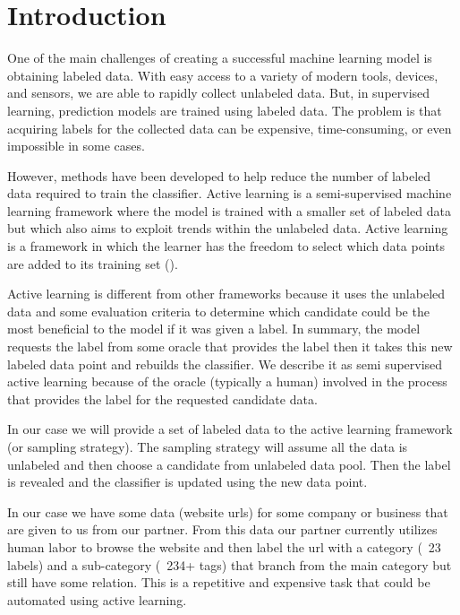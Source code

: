 \chapter*{Introduction}

One of the main challenges of creating a successful machine learning model is obtaining labeled data. With easy access to a variety of modern tools, devices, and sensors, we are able to rapidly collect unlabeled data. But, in supervised learning, prediction models are trained using labeled data. The problem is that acquiring labels for the collected data can be expensive, time-consuming, or even impossible in some cases.  

However, methods have been developed to help reduce the number of labeled data required to train the classifier. Active learning is a semi-supervised machine learning framework where the model is trained with a smaller set of labeled data but which also aims to exploit trends within the unlabeled data. Active learning is a framework in which the learner has the freedom to select which data points are added to its training set (\cite{roy2001eer}). 

Active learning is different from other frameworks because it uses the unlabeled data and some evaluation criteria to determine which candidate could be the most beneficial to the model if it was given a label. In summary, the model requests the label from some oracle that provides the label then it takes this new labeled data point and rebuilds the classifier. We describe it as semi supervised active learning because of the oracle (typically a human) involved in the process that provides the label for the requested candidate data. 

In our case we will provide a set of labeled data to the active learning framework (or sampling strategy). The sampling strategy will assume all the data is unlabeled and then choose a candidate from unlabeled data pool. Then the label is revealed and the classifier is updated using the new data point.

In our case we have some data (website urls) for some company or business that are given to us from our partner. From this data our partner currently utilizes human labor to browse the website and then label the url with a category (~23 labels) and a sub-category (~234+ tags) that branch from the main category but still have some relation. This is a repetitive and expensive task that could be automated using active learning.


